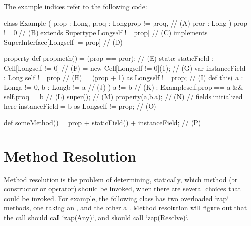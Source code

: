 The example indices refer to the following code:
\begin{xten}
class Example (
   prop : Long,
   proq : Long{prop != proq},                    // (A)
   pror : Long
   )
   {prop != 0}                                  // (B)
   extends Supertype[Long{self != prop}]         // (C)
   implements SuperInterface[Long{self != prop}] // (D)
{
   property def propmeth() = (prop == pror);    // (E)
   static staticField
      : Cell[Long{self != 0}]                    // (F)
      = new Cell[Long{self != 0}](1);            // (G)
   var instanceField
      : Long {self != prop}                      // (H)
      = (prop + 1) as Long{self != prop};        // (I)
   def this(
      a : Long{a != 0},
      b : Long{b != a}                           // (J)
      )
      {a != b}                                  // (K)
      : Example{self.prop == a && self.proq==b} // (L)
   {
      super();                                  // (M)
      property(a,b,a);                          // (N)
      // fields initialized here
      instanceField = b as Long{self != prop};   // (O)
   }

   def someMethod() =
        prop + staticField() + instanceField;   // (P)
}
\end{xten}
%

\section{Method Resolution}
\label{sect:MethodResolution}

Method resolution is the problem of determining, statically, which method (or
constructor or operator)
should be invoked, when there are several choices that could be invoked.  For
example, the following class has two overloaded \xcd`zap` methods, one taking
an , and the other a .  Method resolution will figure
out that the call  should call \xcd`zap(Any)`, and
 should call \xcd`zap(Resolve)`.  


